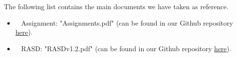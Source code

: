 The following list contains the main documents we have taken as reference.

\begin{itemize}
\item~ Assignment: "Assignments.pdf" (can be found in our Github repository \href{https://github.com/TommasoBianchi/BettiBianchi_SWENG2/blob/master/Assignments.pdf}{here}).
\item~ RASD: "RASDv1.2.pdf" (can be found in our Github repository \href{https://github.com/TommasoBianchi/BettiBianchi_SWENG2/blob/master/Releases/RASD_v1.1.pdf}{here}).
\end{itemize}